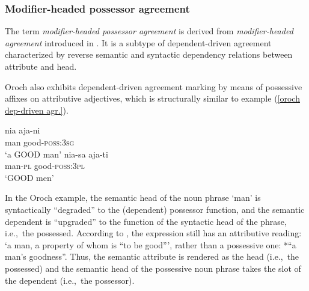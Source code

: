 \subsubsection{Modifier\hyp{}headed possessor agreement} \label{ModheadAgr}
The term \emph{modifier\hyp{}headed possessor agreement} is derived from \emph{modifier\hyp{}headed agreement} introduced in \citet{AUTOTYP-NP}. It is a subtype of dependent\hyp{}driven agreement characterized by reverse semantic and syntactic dependency relations between attribute and head. 

Oroch also exhibits dependent\hyp{}driven agreement marking by means of possessive affixes on attributive adjectives, which is structurally similar to example (\ref{oroch dep-driven agr.}).
\begin{exe}
\ex
\label{oroch mod-headed agr}
\begin{xlist}
\ex
\gll 	nia	aja-ni\\
	man	good-\textsc{poss:3sg}\\
\glt	‘a GOOD man’
\ex 
\gll nia-sa aja-ti\\	
	man-\textsc{pl} good-\textsc{poss:3pl}\\
\glt	‘GOOD men’
\end{xlist}
\end{exe}
In the Oroch example, the semantic head of the noun phrase ‘man’ is syntactically “degraded” to the (dependent) possessor function, and the semantic dependent is “upgraded” to the function of the syntactic head of the phrase, i.e.,~the possessed. According to \citet[3]{malchukov2000}, the expression still has an attributive reading: ‘a man, a property of whom is “to be good”’, rather than a possessive one: *“a man's goodness”. Thus, the semantic attribute is rendered as the head (i.e.,~the possessed) and the semantic head of the possessive noun phrase takes the slot of the dependent (i.e.,~the possessor).

